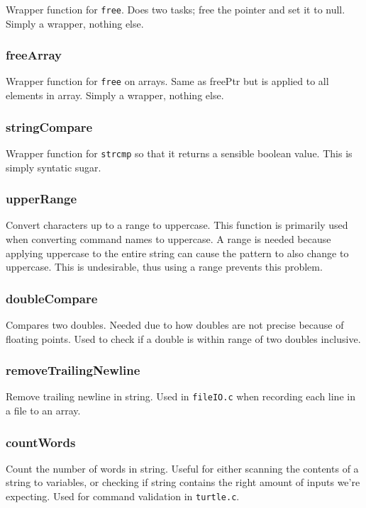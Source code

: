 \documentclass[a4paper, 12pt, titlepage]{article}
\newcommand{\code}[1]{\small\texttt{#1}\normalsize}
\begin{document}
Wrapper function for \code{free}. Does two tasks; free the pointer and 
set it to null. Simply a wrapper, nothing else.

\subsubsection{freeArray}

Wrapper function for \code{free} on arrays. Same as freePtr but is applied 
to all elements in array. Simply a wrapper, nothing else.

\subsubsection{stringCompare}

Wrapper function for \code{strcmp} so that it returns a sensible boolean 
value. This is simply syntatic sugar.

\subsubsection{upperRange}

Convert characters up to a range to uppercase. This function is primarily 
used when converting command names to uppercase. A range is needed because 
applying uppercase to the entire string can cause the pattern to also change 
to uppercase. This is undesirable, thus using a range prevents this problem.

\subsubsection{doubleCompare}

Compares two doubles. Needed due to how doubles are not precise because of 
floating points. Used to check if a double is within range of two doubles 
inclusive.

\subsubsection{removeTrailingNewline}

Remove trailing newline in string. Used in \code{fileIO.c} when recording 
each line in a file to an array.

\subsubsection{countWords}

Count the number of words in string. Useful for either scanning the contents 
of a string to variables, or checking if string contains the right amount of 
inputs we're expecting. Used for command validation in \code{turtle.c}.
\end{document}
